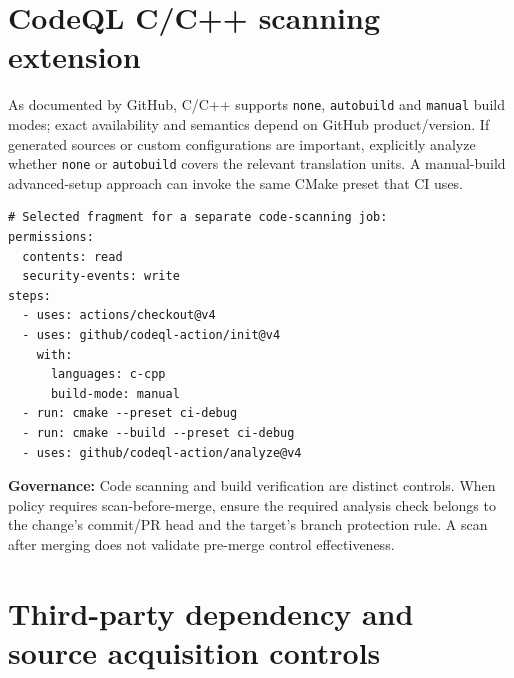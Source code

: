 \documentclass[11pt,letterpaper,oneside]{report}
\providecommand{\passthrough}[1]{#1}
\begin{document}
\chapter{CodeQL C/C++ scanning
extension}\label{codeql-cc-scanning-extension}

As documented by GitHub, C/C++ supports \passthrough{\lstinline!none!},
\passthrough{\lstinline!autobuild!} and \passthrough{\lstinline!manual!}
build modes; exact availability and semantics depend on GitHub
product/version. If generated sources or custom configurations are
important, explicitly analyze whether \passthrough{\lstinline!none!} or
\passthrough{\lstinline!autobuild!} covers the relevant translation
units. A manual-build advanced-setup approach can invoke the same CMake
preset that CI uses.

\begin{lstlisting}
# Selected fragment for a separate code-scanning job:
permissions:
  contents: read
  security-events: write
steps:
  - uses: actions/checkout@v4
  - uses: github/codeql-action/init@v4
    with:
      languages: c-cpp
      build-mode: manual
  - run: cmake --preset ci-debug
  - run: cmake --build --preset ci-debug
  - uses: github/codeql-action/analyze@v4
\end{lstlisting}

\textbf{Governance:} Code scanning and build verification are distinct
controls. When policy requires scan-before-merge, ensure the required
analysis check belongs to the change's commit/PR head and the target's
branch protection rule. A scan after merging does not validate pre-merge
control effectiveness.

\chapter{Third-party dependency and source acquisition
controls}\label{third-party-dependency-and-source-acquisition-controls}
\end{document}
